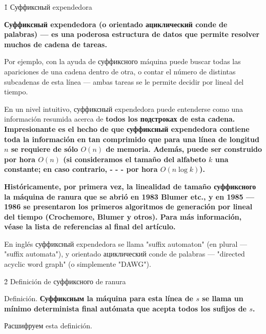 \h1{ Суффиксный expendedora }

\bf{Суффиксный expendedora} (o \bf{orientado ациклический conde de palabras}) --- es una poderosa estructura de datos que permite resolver muchos de cadena de tareas.

Por ejemplo, con la ayuda de суффиксного máquina puede buscar todas las apariciones de una cadena dentro de otra, o contar el número de distintas subcadenas de esta línea --- ambas tareas se le permite decidir por lineal del tiempo.

En un nivel intuitivo, суффиксный expendedora puede entenderse como una información resumida acerca de \bf{todos los подстроках} de esta cadena. Impresionante es el hecho de que суффиксный expendedora contiene toda la información en tan comprimido que para una línea de longitud $n$ se requiere de sólo $O(n)$ de memoria. Además, puede ser construido por hora $O(n)$ (si consideramos el tamaño del alfabeto $k$ una constante; en caso contrario, - - - por hora $O (n \log k)$).

\bf{Históricamente}, por primera vez, la linealidad de tamaño суффиксного la máquina de ranura que se abrió en 1983 Blumer etc., y en 1985 --- 1986 se presentaron los primeros algoritmos de generación por lineal del tiempo (Crochemore, Blumer y otros). Para más información, véase la lista de referencias al final del artículo.

En inglés суффиксный expendedora se llama "suffix automaton" (en plural --- "suffix automata"), y orientado ациклический conde de palabras --- "directed acyclic word graph" (o simplemente "DAWG").


\h2{ Definición de суффиксного de ranura }

Definición. \bf{Суффиксным la máquina} para esta línea de $s$ se llama un mínimo determinista final autómata que acepta todos los sufijos de $s$.

Расшифруем esta definición.

